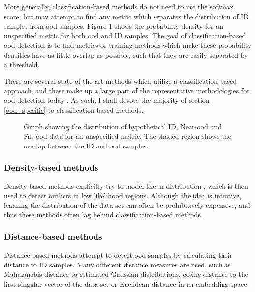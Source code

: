 \documentclass[UKenglish]{uiomasterthesis} %
\theoremstyle{definition}
\begin{document}
More generally, classification-based methods do not need to use the softmax score, but may attempt to find any metric which separates the distribution of ID samples from \ac{ood} samples. Figure \ref{fig:ood_metric} shows the probability density for an unspecified metric for both \ac{ood} and ID samples. The goal of classification-based \ac{ood} detection is to find metrics or training methods which make these probability densities have as little overlap as possible, such that they are easily separated by a threshold.

There are several state of the art methods which utilize a classification-based approach, and these make up a large part of the representative methodologies for \ac{ood} detection today \cite[8]{oodoverview}. As such, I shall devote the majority of section \ref{ood_specific} to classification-based methods.

\begin{figure}
    \label{fig:ood_metric}
    \begin{center}
        
    \end{center}
    \caption[Hypothetical ID/\ac{ood} distributions for an \ac{ood} detection metric]{Graph showing the distribution of hypothetical ID, Near-\ac{ood} and Far-\ac{ood} data for an unspecified metric. The shaded region shows the overlap between the ID and \ac{ood} samples.}
\end{figure}


\subsubsection{Density-based methods}

Density-based methods explicitly try to model the in-distribution \cite{oodoverview}, which is then used to detect outliers in low likelihood regions. Although the idea is intuitive, learning the distribution of the data set can often be prohibitively expensive, and thus these methods often lag behind classification-based methods \cite{oodoverview}.
\\

\subsubsection{Distance-based methods} \label{section:distancebasedood}

Distance-based methods attempt to detect \ac{ood} samples by calculating their distance to ID samples. Many different distance measures are used, such as Mahalanobis distance to estimated Gaussian distributions, cosine distance to the first singular vector of the data set or Euclidean distance in an embedding space.
\\
\end{document}
